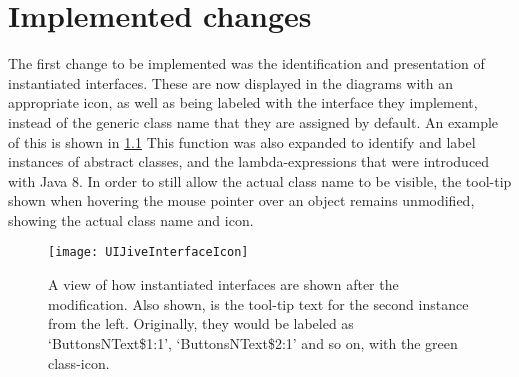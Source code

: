 \chapter{Implemented changes}\label{jiveImpl}%

The first change to be implemented was the identification and presentation of instantiated interfaces.
These are now displayed in the diagrams with an appropriate icon, as well as being labeled with the interface they implement, instead of the generic class name that they are assigned by default.
An example of this is shown in \cref{fig:JiveNewIcon}
This function was also expanded to identify and label instances of abstract classes, and the lambda-expressions that were introduced with Java 8.
In order to still allow the actual class name to be visible, the tool-tip shown when hovering the mouse pointer over an object remains unmodified, showing the actual class name and icon.
\begin{figure}[H]
	\centering
	\texttt{[image: UIJiveInterfaceIcon]}
	\caption[A view of how instantiated interfaces are shown after the modification.]{A view of how instantiated interfaces are shown after the modification. Also shown, is the tool-tip text for the second instance from the left. Originally, they would be labeled as `ButtonsNText\$1:1', `ButtonsNText\$2:1' and so on, with the green class-icon.}
	\label{fig:JiveNewIcon}
\end{figure}

